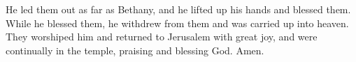 \myverse{}He led them out as far as Bethany, and he lifted up his hands
and blessed them.
\myverse{}While he blessed them, he withdrew from them and was carried up into heaven.
\myverse{}They worshiped him and returned to Jerusalem with great joy,
\myverse{}and were continually in the temple, praising and blessing God. Amen.


